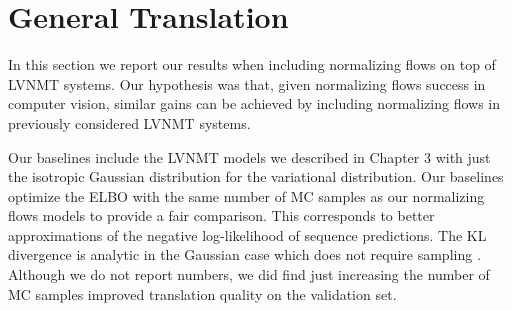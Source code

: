

\section{General Translation}

In this section we report our results when including normalizing flows on top of \ac{LVNMT} systems. Our hypothesis was that, given normalizing flows success in computer vision, similar gains can be achieved by including normalizing flows in previously considered \ac{LVNMT} systems.  

Our baselines include the \ac{LVNMT} models we described in Chapter 3 with just the isotropic Gaussian distribution for the variational distribution. Our baselines optimize the \ac{ELBO} with the same number of \ac{MC} samples as our normalizing flows models to provide a fair comparison. This corresponds to better approximations of the negative log-likelihood of sequence predictions. The KL divergence is analytic in the Gaussian case which does not require sampling \cite{kingma2014autoencodingVB,rezende2014stochasticBackprop}. Although we do not report numbers, we did find just increasing the number of \ac{MC} samples improved translation quality on the validation set.

